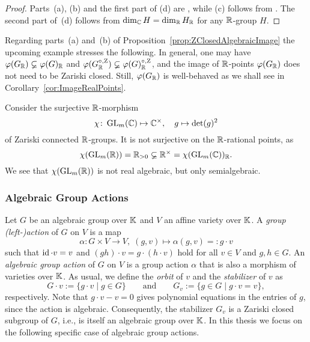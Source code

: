 \begin{proof}
	Parts~(a), (b) and the first part of (d) are \cite[Corollary~1.4]{BorelBook}, while (c) follows from \cite[Propositions~2.2.5(i) and~12.1.3]{SpringerBook}. The second part of~(d) follows from $\dim_\mathbb C H = \dim_\mathbb R H_\mathbb R$ for any $\mathbb R$-group $H$.
\end{proof}

Regarding parts~(a) and~(b) of Proposition~\ref{prop:ZClosedAlgebraicImage} the upcoming example stresses the following. In general, one may have $\varphi(G_{\mathbb R}) \varsubsetneq \varphi(G)_{\mathbb R}$ and $\varphi(G_{\mathbb R}^{\circ, \operatorname{Z}}) \varsubsetneq \varphi(G)_{\mathbb R}^{\circ,\operatorname{Z}}$, and the image of $\mathbb R$-points $\varphi(G_{\mathbb R})$ does not need to be Zariski closed. Still, $\varphi(G_{\mathbb R})$ is well-behaved as we shall see in Corollary~\ref{cor:ImageRealPoints}.

\begin{example}\label{ex:BorelRealPoints}
	Consider the surjective $\mathbb R$-morphism
		\[ \chi \colon \operatorname{GL}_m(\mathbb C) \mapsto \mathbb C^\times , \quad g \mapsto \det(g)^2\]
	of Zariski connected $\mathbb R$-groups. It is not surjective on the $\mathbb R$-rational points, as
		\[ \chi(\operatorname{GL}_m(\mathbb R)) = \mathbb R_{>0} \varsubsetneq \mathbb R^\times  = \chi(\operatorname{GL}_m(\mathbb C))_{\mathbb R} . \]
	We see that $\chi(\operatorname{GL}_m(\mathbb R))$ is not real algebraic, but only semialgebraic.
	\hfill\exSymbol
\end{example}







\subsubsection{Algebraic Group Actions}


Let $G$ be an algebraic group over $\mathbb K$ and $V$ an affine variety over $\mathbb K$.
A \emph{group (left-)action} of $G$ on $V$ is a map
	\[ \alpha \colon G \times V \to V, \; (g,v) \mapsto \alpha(g,v) =: g \cdot v \]
such that $\operatorname{id} \cdot v = v$ and $(gh) \cdot v = g \cdot (h \cdot v)$ hold for all $v \in V$ and $g,h \in G$.
An \emph{algebraic group action} of $G$ on $V$ is a group action $\alpha$ that is also a morphism of varieties over $\mathbb K$.
As usual, we define the \emph{orbit} of $v$ and the \emph{stabilizer} of $v$ as
	\begin{equation}\label{eq:defnOrbitAndStabilizer}
		G \cdot v := \big\lbrace g \cdot v \mid g \in G \big\rbrace \qquad \text{and} \qquad
		G_v := \big\{ g \in G \mid g \cdot v = v \big\},
	\end{equation}
respectively. Note that $g \cdot v - v = 0$ gives polynomial equations in the entries of $g$, since the action is algebraic. Consequently, the stabilizer $G_v$ is a Zariski closed subgroup of $G$, i.e., is itself an algebraic group over $\mathbb K$.
In this thesis we focus on the following specific case of algebraic group actions.

